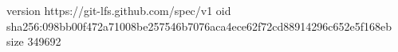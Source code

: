 version https://git-lfs.github.com/spec/v1
oid sha256:098bb00f472a71008be257546b7076aca4ece62f72cd88914296c652e5f168eb
size 349692

